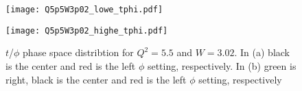 \begin{figure}
  \centering
  \begin{minipage}[b]{0.48\linewidth}
    \texttt{[image: Q5p5W3p02\_lowe\_tphi.pdf]}
  \end{minipage}
  \begin{minipage}[b]{0.48\linewidth}
    \texttt{[image: Q5p5W3p02\_highe\_tphi.pdf]}
  \end{minipage}  
  \caption{$t$/$\phi$ phase space distribtion for $Q^2=5.5$ and $W=3.02$. In (a) black is the center and red is the left $\phi$ setting, respectively. In (b) green is right, black is the center and red is the left $\phi$ setting, respectively}
  \label{fig:Q5p5W3p02_tphi}
\end{figure}

